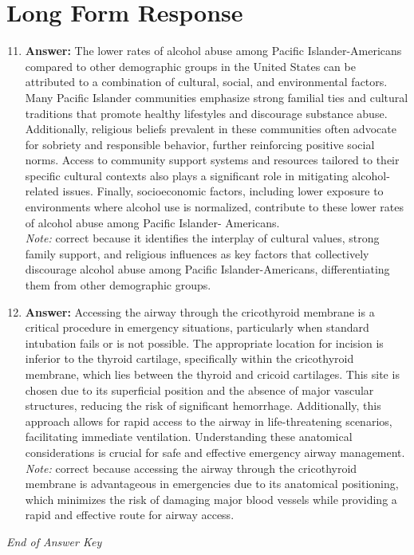 \documentclass[12pt]{article}
\begin{document}
\section*{Long Form Response}
\begin{enumerate}[label=\arabic*.]
\setcounter{enumi}{10}
\item \textbf{Answer:} The lower rates of alcohol abuse among Pacific Islander-Americans compared to other demographic groups in the United States can be attributed to a combination of cultural, social, and environmental factors. Many Pacific Islander communities emphasize strong familial ties and cultural traditions that promote healthy lifestyles and discourage substance abuse. Additionally, religious beliefs prevalent in these communities often advocate for sobriety and responsible behavior, further reinforcing positive social norms. Access to community support systems and resources tailored to their specific cultural contexts also plays a significant role in mitigating alcohol-related issues. Finally, socioeconomic factors, including lower exposure to environments where alcohol use is normalized, contribute to these lower rates of alcohol abuse among Pacific Islander- Americans.
\\ \textit{Note:} correct because it identifies the interplay of cultural values, strong family support, and religious influences as key factors that collectively discourage alcohol abuse among Pacific Islander-Americans, differentiating them from other demographic groups.
\item \textbf{Answer:} Accessing the airway through the cricothyroid membrane is a critical procedure in emergency situations, particularly when standard intubation fails or is not possible. The appropriate location for incision is inferior to the thyroid cartilage, specifically within the cricothyroid membrane, which lies between the thyroid and cricoid cartilages. This site is chosen due to its superficial position and the absence of major vascular structures, reducing the risk of significant hemorrhage. Additionally, this approach allows for rapid access to the airway in life-threatening scenarios, facilitating immediate ventilation. Understanding these anatomical considerations is crucial for safe and effective emergency airway management.
\\ \textit{Note:} correct because accessing the airway through the cricothyroid membrane is advantageous in emergencies due to its anatomical positioning, which minimizes the risk of damaging major blood vessels while providing a rapid and effective route for airway access.
\end{enumerate}

\vfill
\noindent\textit{End of Answer Key}
\end{document}
